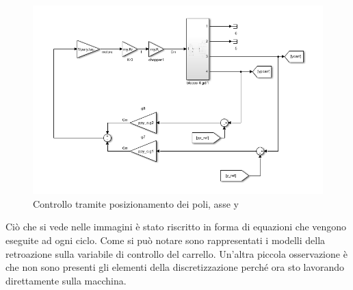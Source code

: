 \documentclass{article}
\begin{document}
\begin{figure}[H]
    \centering
    \includegraphics[width=.6\textwidth]{./simulink/pospoli/y/Cpospoli.png}
    \caption{Controllo tramite posizionamento dei poli, asse y}
\end{figure}

Ciò che si vede nelle immagini è stato riscritto in forma di equazioni che vengono eseguite ad ogni ciclo. Come si può notare sono rappresentati i modelli della retroazione sulla variabile di controllo del carrello. Un'altra piccola osservazione è che non sono presenti gli elementi della discretizzazione perché ora sto lavorando direttamente sulla macchina.
\end{document}
